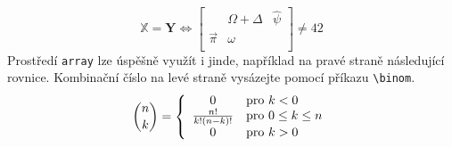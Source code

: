 \documentclass[a4paper, 11pt, twocolumn]{article}
\begin{document}
\begin{displaymath} 
    \mathbb{X} = \mathbf{Y} \Longleftrightarrow 
    \left[\begin{array}{ccc}
        \phantom{} & \Omega + \Delta & \hat{\psi}\\
        \vec{\pi} & \omega & \phantom{}\\
    \end{array}\right]
    \neq 42 
\end{displaymath}
\indent Prostředí \verb|array| lze úspěšně využít i jinde, například na pravé straně následující rovnice. 
Kombinační číslo na levé straně vysázejte pomocí příkazu \verb|\binom|.
\begin{displaymath}
    \binom{n}{k} = \left\{
        \begin{array}{c l}
        0 & \text{pro } k < 0 \\
        \frac{n!}{k!(n-k)!} & \text{pro } 0 \leq k \leq n \\
        0 & \text{pro } k > 0
        \end{array} \right.
\end{displaymath}
\end{document}
